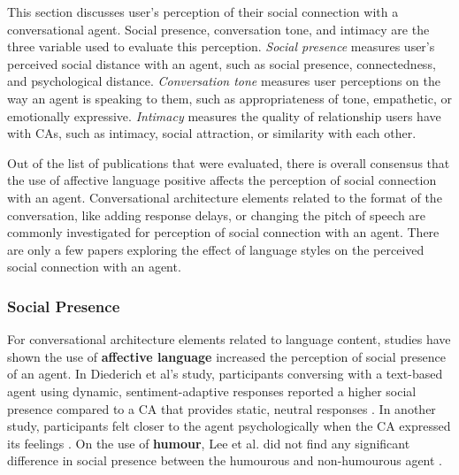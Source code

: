 \documentclass[sigconf,screen,review, anonymous]{acmart}
\newcommand{\cmt}[1]{}%
\begin{document}
This section discusses user's perception of their social connection with a conversational agent. Social presence, conversation tone, and intimacy are the three variable used to evaluate this perception. \textit{Social presence} measures user's perceived social distance with an agent, such as social presence, connectedness, and psychological distance. \textit{Conversation tone} measures user perceptions on the way an agent is speaking to them, such as appropriateness of tone, empathetic, or emotionally expressive. \textit{Intimacy} measures the quality of relationship users have with CAs, such as intimacy, social attraction, or similarity with each other.

Out of the list of publications that were evaluated, there is overall consensus that the use of affective language positive affects the perception of social connection with an agent. Conversational architecture elements related to the format of the conversation, like adding response delays, or changing the pitch of speech are commonly investigated for perception of social connection with an agent. There are only a few papers exploring the effect of language styles on the perceived social connection with an agent. 

\subsubsection{Social Presence}
For conversational architecture elements related to language content, studies have shown the use of \textbf{affective language} increased the perception of social presence of an agent. In Diederich et al's study, participants conversing with a text-based agent using dynamic, sentiment-adaptive responses reported a higher social presence compared to a CA that provides static, neutral responses \cite{diederich2019emulating}\cmt{[25]}. In another study, participants felt closer to the agent psychologically when the CA expressed its feelings \cite{lee2019s}\cmt{[55]}. On the use of \textbf{humour}, Lee et al. did not find any significant difference in social presence between the humourous and non-humourous agent \cite{lee2019s}\cmt{[55]}.


\end{document}
